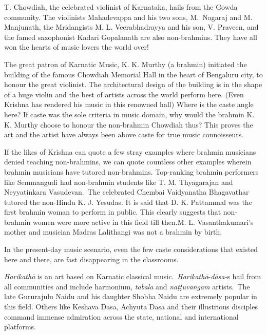 T. Chowdiah, the celebrated violinist of Karnataka, hails from the Gowda community. The violinists Mahadevappa and his two sons, M.~Nagaraj and M. Manjunath, the Mridangists M. L. Veerabhadrayya and his son, V. Praveen, and the famed saxophonist Kadari Gopalanath are also non-brahmins. They have all won the hearts of music lovers the world over!

The great patron of Karnatic Music, K. K. Murthy (a brahmin) initiated the building of the famous Chowdiah Memorial Hall in the heart of Bengaluru city, to honour the great violinist. The architectural design of the building is in the shape of a huge violin and the best of artists across the world perform here. (Even Krishna has rendered his music in this renowned hall) Where is the caste angle here? If caste was the sole criteria in music domain, why would the brahmin K. K. Murthy choose to honour the non-brahmin Chowdiah thus? This proves the art and the artist have always been above caste for true music connoisseurs.

If the likes of Krishna can quote a few stray examples where brahmin musicians denied teaching non-brahmins, we can quote countless other examples wherein brahmin musicians have tutored non-brahmins. Top-ranking brahmin performers like Semmangudi had non-brahmin students like T. M. Thyagarajan and Neyyatinkara Vasudevan.~The celebrated Chembai Vaidyanatha Bhagavathar tutored the non-Hindu K. J. Yesudas. It is said that D. K. Pattammal was the first brahmin woman to perform in public. This clearly suggests that non-brahmin women were more active in this field till then.\break M. L. Vasanthakumari’s mother and musician Madras Lalithangi was not a brahmin by birth.

In the present-day music scenario, even the few caste considerations that existed here and there, are fast disappearing in the classrooms.

\textit{Harikathā} is an art based on Karnatic classical music.~\textit{Harikathā}-\break \textit{dāsa-}s hail from all communities and include harmonium, \textit{tabala} and \textit{naṭṭuvāṅgam} artists.~The late Gururajulu Naidu and his daughter Shobha Naidu are extremely popular in this field. Others like Keshava Dasa, Achyuta Dasa and their illustrious disciples command immense admiration across the state, national and international platforms.

